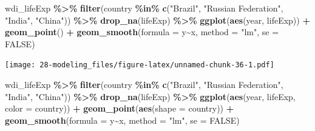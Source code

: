 \documentclass[
  xelatex, ja=standard]{bxjsbook}
\newenvironment{Shaded}{\begin{snugshade}}{\end{snugshade}}
\newcommand{\AttributeTok}[1]{\textcolor[rgb]{0.13,0.29,0.53}{#1}}
\newcommand{\CommentTok}[1]{\textcolor[rgb]{0.56,0.35,0.01}{\textit{#1}}}
\newcommand{\ConstantTok}[1]{\textcolor[rgb]{0.56,0.35,0.01}{#1}}
\newcommand{\FunctionTok}[1]{\textcolor[rgb]{0.13,0.29,0.53}{\textbf{#1}}}
\newcommand{\NormalTok}[1]{#1}
\newcommand{\OtherTok}[1]{\textcolor[rgb]{0.56,0.35,0.01}{#1}}
\newcommand{\SpecialCharTok}[1]{\textcolor[rgb]{0.81,0.36,0.00}{\textbf{#1}}}
\newcommand{\StringTok}[1]{\textcolor[rgb]{0.31,0.60,0.02}{#1}}
\theoremstyle{definition}
\theoremstyle{definition}
\theoremstyle{definition}
\theoremstyle{definition}
\theoremstyle{remark}
\begin{document}
\begin{Shaded}
\end{Shaded}

\begin{Shaded}
\begin{Highlighting}[]
\NormalTok{wdi\_lifeExp }\SpecialCharTok{\%\textgreater{}\%} \FunctionTok{filter}\NormalTok{(country }\SpecialCharTok{\%in\%} \FunctionTok{c}\NormalTok{(}\StringTok{"Brazil"}\NormalTok{, }\StringTok{"Russian Federation"}\NormalTok{, }\StringTok{"India"}\NormalTok{, }\StringTok{"China"}\NormalTok{)) }\SpecialCharTok{\%\textgreater{}\%} \FunctionTok{drop\_na}\NormalTok{(lifeExp) }\SpecialCharTok{\%\textgreater{}\%}
  \FunctionTok{ggplot}\NormalTok{(}\FunctionTok{aes}\NormalTok{(year, lifeExp)) }\SpecialCharTok{+} \FunctionTok{geom\_point}\NormalTok{() }\SpecialCharTok{+} \FunctionTok{geom\_smooth}\NormalTok{(}\AttributeTok{formula =}\NormalTok{ y}\SpecialCharTok{\textasciitilde{}}\NormalTok{x, }\AttributeTok{method =} \StringTok{"lm"}\NormalTok{, }\AttributeTok{se =} \ConstantTok{FALSE}\NormalTok{)}
\end{Highlighting}
\end{Shaded}

\texttt{[image: 28-modeling\_files/figure-latex/unnamed-chunk-36-1.pdf]}

\begin{Shaded}
\begin{Highlighting}[]
\NormalTok{wdi\_lifeExp }\SpecialCharTok{\%\textgreater{}\%} \FunctionTok{filter}\NormalTok{(country }\SpecialCharTok{\%in\%} \FunctionTok{c}\NormalTok{(}\StringTok{"Brazil"}\NormalTok{, }\StringTok{"Russian Federation"}\NormalTok{, }\StringTok{"India"}\NormalTok{, }\StringTok{"China"}\NormalTok{)) }\SpecialCharTok{\%\textgreater{}\%} \FunctionTok{drop\_na}\NormalTok{(lifeExp) }\SpecialCharTok{\%\textgreater{}\%}
  \FunctionTok{ggplot}\NormalTok{(}\FunctionTok{aes}\NormalTok{(year, lifeExp, }\AttributeTok{color =}\NormalTok{ country)) }\SpecialCharTok{+} \FunctionTok{geom\_point}\NormalTok{(}\FunctionTok{aes}\NormalTok{(}\AttributeTok{shape =}\NormalTok{ country)) }\SpecialCharTok{+} \FunctionTok{geom\_smooth}\NormalTok{(}\AttributeTok{formula =}\NormalTok{ y}\SpecialCharTok{\textasciitilde{}}\NormalTok{x, }\AttributeTok{method =} \StringTok{"lm"}\NormalTok{, }\AttributeTok{se =} \ConstantTok{FALSE}\NormalTok{)}
\end{Highlighting}
\end{Shaded}
\end{document}
